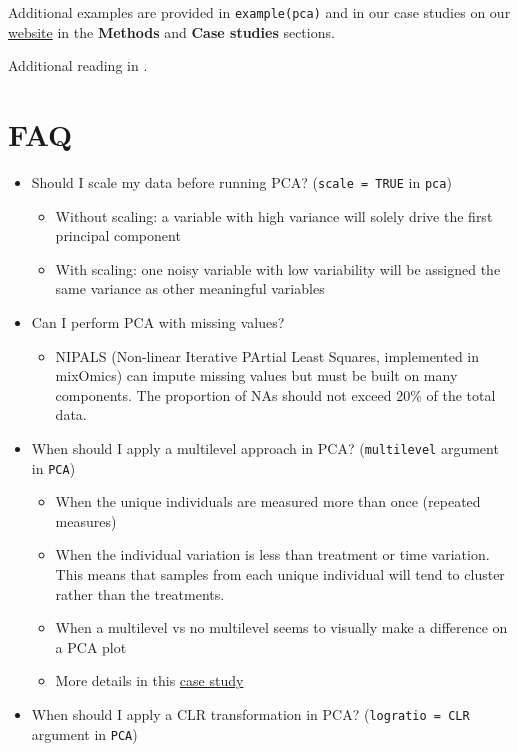 \documentclass[]{book}
\providecommand{\tightlist}{%
  \setlength{\itemsep}{0pt}\setlength{\parskip}{0pt}}
\begin{document}
Additional examples are provided in \texttt{example(pca)} and in our case studies on our \href{http://www.mixomics.org}{website} in the \textbf{Methods} and \textbf{Case studies} sections.

Additional reading in \citep{She08}.

\hypertarget{faq}{%
\section{FAQ}\label{faq}}

\begin{itemize}
\tightlist
\item
  Should I scale my data before running PCA? (\texttt{scale\ =\ TRUE} in \texttt{pca})

  \begin{itemize}
  \tightlist
  \item
    Without scaling: a variable with high variance will solely drive the first principal component
  \item
    With scaling: one noisy variable with low variability will be assigned the same variance as other meaningful variables
  \end{itemize}
\item
  Can I perform PCA with missing values?

  \begin{itemize}
  \tightlist
  \item
    NIPALS (Non-linear Iterative PArtial Least Squares, implemented in mixOmics) can impute missing values but must be built on many components. The proportion of NAs should not exceed 20\% of the total data.
  \end{itemize}
\item
  When should I apply a multilevel approach in PCA? (\texttt{multilevel} argument in \texttt{PCA})

  \begin{itemize}
  \tightlist
  \item
    When the unique individuals are measured more than once (repeated measures)
  \item
    When the individual variation is less than treatment or time variation. This means that samples from each unique individual will tend to cluster rather than the treatments.
  \item
    When a multilevel vs no multilevel seems to visually make a difference on a PCA plot
  \item
    More details in this \href{http://mixomics.org/case-studies/multilevel-vac18/}{case study}
  \end{itemize}
\item
  When should I apply a CLR transformation in PCA? (\texttt{logratio\ =\ \textquotesingle{}CLR\textquotesingle{}} argument in \texttt{PCA})


\end{itemize}
\end{document}
